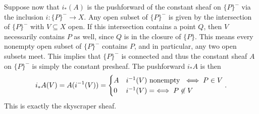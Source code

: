 \begin{homework}[e]
\begin{prf}
		Suppose now that $i_*(A)$ is the pushforward of the constant sheaf on $\{P\}^-$ via the inclusion $i:\{P\}^-\to X$. Any open subset of $\{P\}^-$ is given by the intersection of $\{P\}^-$ with $V\subseteq X$ open. If this intersection contains a point $Q$, then $V$ necessarily contains $P$ as well, since $Q$ is in the closure of $\{P\}$. This means every nonempty open subset of $\{P\}^-$ contains $P$, and in particular, any two open subsets meet. This implies that $\{P\}^-$ is connected and thus the constant sheaf $A$ on $\{P\}^-$ is simply the constant presheaf. The pushforward $i_*A$ is then
		\begin{align*}
			i_*A(V) = A(i^{-1}(V)) =
			\begin{cases}
				A & i^{-1}(V) \text{ nonempty } \iff P\in V\\
				0 & i^{-1}(V) = \empty \iff P\not\in V
			\end{cases}.
		\end{align*}
		This is exactly the skyscraper sheaf.
	\end{prf}
\end{homework}

